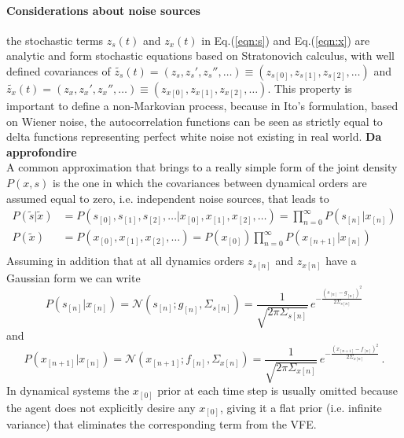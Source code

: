 \documentclass[a4paper, 10pt]{article}
\begin{document}
\paragraph{Considerations about noise sources}
the stochastic terms $z_{s}(t)$ and $z_{x}(t)$ in Eq.(\ref{eqn:s}) and Eq.(\ref{eqn:x}) are analytic and form stochastic equations based on Stratonovich calculus, with well defined covariances of $\tilde{z_{s}}(t) = (z_{s},z_{s}',z_{s}'',\dots) \equiv (z_{s[0]}, z_{s[1]}, z_{s[2]}, \dots)$ and $\tilde{z_{x}}(t) = (z_{x},z_{x}',z_{x}'',\dots) \equiv (z_{x[0]}, z_{x[1]}, z_{x[2]}, \dots)$. This property is important to define a non-Markovian process, because in Ito's formulation, based on Wiener noise, the autocorrelation functions can be seen as strictly equal to delta functions representing perfect white noise not existing in real world. \textbf{Da approfondire}\\
A common approximation that brings to a really simple form of the joint density $P(x,s)$ is the one in which the covariances between dynamical orders are assumed equal to zero, i.e. independent noise sources, that leads to 
\begin{equation}
\begin{split}
P(\tilde{s} | \tilde{x}) & = P(s_{[0]}, s_{[1]}, s_{[2]}, \dots | x_{[0]}, x_{[1]}, x_{[2]}, \dots) = \prod_{n=0}^{\infty} P(s_{[n]} | x_{[n]}) \\
P(\tilde{x}) & = P(x_{[0]}, x_{[1]}, x_{[2]}, \dots) = P(x_{[0]}) \prod_{n=0}^{\infty} P(x_{[n+1]} | x_{[n]}) \\
\end{split}
\end{equation}
Assuming in addition that at all dynamics orders $z_{s[n]}$ and $z_{x[n]}$ have a Gaussian form we can write
\begin{equation}
P(s_{[n]} | x_{[n]}) = \mathcal{N}(s_{[n]};g_{[n]},\Sigma_{s[n]})
	=\frac{1}{\sqrt{2\pi \Sigma_{s[n]}}} \, e^{-\frac{(s_{[n]}-g_{[n]})^2}{2 \Sigma_{s[n]}}}
\end{equation}
and
\begin{equation}
P(x_{[n+1]} | x_{[n]}) = \mathcal{N}(x_{[n+1]};f_{[n]},\Sigma_{x[n]})
	=\frac{1}{\sqrt{2\pi \Sigma_{x[n]}}} \, e^{-\frac{(x_{[n+1]}-f_{[n]})^2}{2 \Sigma_{x[n]}}} \, .
\end{equation}
In dynamical systems the $x_{[0]}$ prior at each time step is usually omitted because the agent does not explicitly desire any $x_{[0]}$, giving it a flat prior (i.e. infinite variance) that eliminates the corresponding term from the VFE. 
\end{document}
